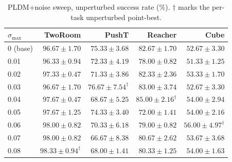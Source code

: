 \documentclass[10pt]{article}
\newcommand{\stdmax}{\ensuremath{\sigma_{\max}}}
\begin{document}
\begin{table}[H]
\centering
\caption{PLDM+noise sweep, unperturbed success rate (\%). $\dagger$ marks the per-task unperturbed point-best.}
\label{tab:pldm-sweep-unperturbed}
\small
\setlength{\tabcolsep}{4pt}
\begin{tabular}{lrrrr}
\toprule
\stdmax{} & TwoRoom & PushT & Reacher & Cube \\
\midrule
0 (base)  & $96.67 \pm 1.70$ & $75.33 \pm 3.68$  & $82.67 \pm 1.70$ & $52.67 \pm 3.30$ \\
0.01     & $96.33 \pm 0.94$ & $72.33 \pm 4.19$  & $78.00 \pm 0.82$ & $51.33 \pm 1.25$ \\
0.02     & $97.33 \pm 0.47$ & $71.33 \pm 3.86$  & $82.33 \pm 2.36$ & $53.33 \pm 1.70$ \\
0.03     & $96.67 \pm 1.70$ & $76.67 \pm 7.54^{\dagger}$  & $83.00 \pm 3.74$ & $52.67 \pm 3.30$ \\
0.04     & $97.67 \pm 0.47$ & $68.67 \pm 5.25$  & $85.00 \pm 2.16^{\dagger}$ & $54.00 \pm 2.94$ \\
0.05     & $97.67 \pm 1.25$ & $74.33 \pm 3.40$  & $72.00 \pm 1.41$ & $54.00 \pm 2.16$ \\
0.06     & $98.00 \pm 0.82$ & $70.33 \pm 6.18$  & $79.00 \pm 0.82$ & $56.00 \pm 4.97^{\dagger}$ \\
0.07     & $98.00 \pm 0.82$ & $66.67 \pm 8.38$  & $80.67 \pm 2.62$ & $53.67 \pm 3.68$ \\
0.08     & $98.33 \pm 0.94^{\dagger}$ & $68.00 \pm 1.41$ & $80.33 \pm 1.25$ & $54.00 \pm 1.63$ \\
\bottomrule
\end{tabular}
\end{table}
\end{document}
